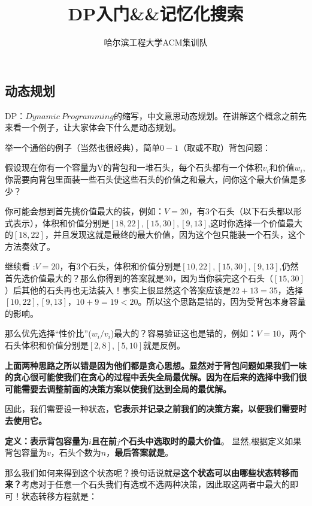 \documentclass[a4paper,10pt]{article}
\title{DP入门\&\&记忆化搜索}
\author{哈尔滨工程大学ACM集训队}
\begin{document}
\begin{CJK}{UTF8}{gbsn}
\maketitle
\section{动态规划}
DP：$Dynamic\ Programming$的缩写，中文意思动态规划。在讲解这个概念之前先来看一个例子，让大家体会下什么是动态规划。\par
举一个通俗的例子（当然也很经典），简单$0-1$（取或不取）背包问题：\begin{CJK}{UTF8}{gkai}假设现在你有一个容量为V的背包和一堆石头，每个石头都有一个体积$v_i$和价值$w_i$,你需要向背包里面装一些石头使这些石头的价值之和最大，问你这个最大价值是多少？\end{CJK}\par
你可能会想到首先挑价值最大的装，例如：$V = 20$，有$3$个石头（以下石头都以\bm{$[v_i,w_i]$}形式表示），体积和价值分别是$[18,22],[15,30],[9,13]$,这时你选择一个价值最大的$[18,22]$，并且发现这就是最终的最大价值，因为这个包只能装一个石头，这个方法奏效了。\par
继续看 :$ V = 20$，有3个石头，体积和价值分别是$[10,22],[15,30],[9,13]$,仍然首先选价值最大的？那么你得到的答案就是30，因为当你装完这个石头（$[15,30]$）后其他的石头再也无法装入！事实上很显然这个答案应该是$22 + 13 = 35$，选择$[10,22],[9,13]$，$10 + 9 = 19 < 20$。所以这个思路是错的，因为受背包本身容量的影响。\par
那么优先选择“性价比”($w_i/v_i$)最大的？容易验证这也是错的，例如：$V = 10$，两个石头体积和价值分别是$[2,8],[5,10]$就是反例。\par
\textbf{上面两种思路之所以错是因为他们都是贪心思想。显然对于背包问题如果我们一味的贪心很可能使我们在贪心的过程中丢失全局最优解。因为在后来的选择中我们很可能需要去调整前面的决策方案以使我们达到全局的最优解。}\par
因此，我们需要设一种状态，\textbf{它表示并记录之前我们的决策方案，以便我们需要时去使用它。}\par
\textbf{定义：表示背包容量为$i$且在前$j$个石头中选取时的最大价值}。
显然,根据定义如果背包容量为$v$，石头个数为$n$，\textbf{最后答案就是}。\par
那么我们如何来得到这个状态呢？换句话说就是\textbf{这个状态可以由哪些状态转移而来？}考虑对于任意一个石头我们有选或不选两种决策，因此取这两者中最大的即可！状态转移方程就是：\par
\begin{center}

\end{center}
\end{CJK}
\end{document}
